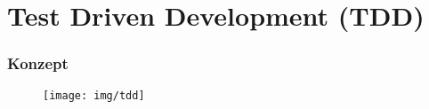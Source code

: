 
\section{Test Driven Development (TDD)}

\begin{frame}
  \frametitle{Konzept}

  \begin{figure}
    \texttt{[image: img/tdd]}\label{img:tdd_concept}
    \centering
  \end{figure}

\end{frame}
